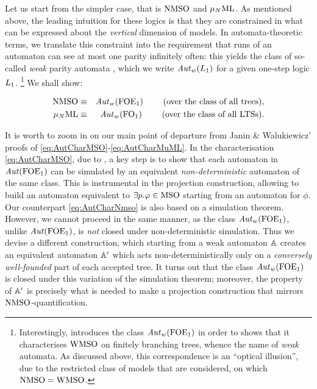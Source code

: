 Let us start from the simpler case, that is $\mathrm{NMSO}$ and $\mu_{N}\mathrm{ML}$.
As mentioned above, the leading intuition for these logics is that they are
constrained in what can be expressed about the \emph{vertical} dimension of 
models. 
In automata-theoretic terms, we translate this constraint into the requirement 
that runs of an automaton can see at most one parity infinitely often: this 
yields the class of so-called \emph{weak} parity 
automata \cite{MullerSaoudiSchupp92}, which we write $\mathit{Aut}_{w}(L_{1})$ for a
given one-step logic $L_{1}$. \footnote{%
    Interestingly, \cite{MullerSaoudiSchupp92} introduces the class
    $\mathit{Aut}_{w}(\mathrm{FOE}_1)$ in order to shows that it characterises $\mathrm{WMSO}$ on 
    finitely branching trees, whence the name of \emph{weak} automata. 
    As discussed above, this correspondence is an ``optical illusion'', due to
    the restricted class of models that are considered, on which $\mathrm{NMSO} = 
    \mathrm{WMSO}$.
    } 
We shall show:
\begin{theorem}
\begin{eqnarray}
\mathrm{NMSO} & \equiv & \mathit{Aut}_{w}(\mathrm{FOE}_1)
  \qquad \text{ (over the class of all trees)}, \label{eq:AutCharNmso}
\\ \mu_{N}\mathrm{ML} & \equiv & \mathit{Aut}_{w}(\mathrm{FO}_1)\label{eq:AutCharMudML}
  \qquad \text{ (over the class of all LTSs)}.
\end{eqnarray}
\end{theorem}
It is worth to zoom in on our main point of departure from Janin \& Walukiewicz' 
proofs of \eqref{eq:AutCharMSO}-\eqref{eq:AutCharMuML}. 
In the characterisation \eqref{eq:AutCharMSO}, due to \cite{Walukiewicz96}, 
a key step is to show that each automaton in $\mathit{Aut}(\mathrm{FOE}_1)$ can be simulated by
an equivalent \emph{non-deterministic} automaton of the same class. 
This is instrumental in the projection construction, allowing to build an
automaton equivalent to $\exists p.\varphi \in \mathrm{MSO}$ starting from an automaton 
for $\phi$. 
Our counterpart \eqref{eq:AutCharNmso} is also based on a simulation theorem. 
However, we cannot proceed in the same manner, as the class $\mathit{Aut}_{w}(\mathrm{FOE}_1)$,
unlike $\mathit{Aut}(\mathrm{FOE}_1)$, is \emph{not} closed under non-deterministic simulation.
Thus we devise a different construction, which starting from a weak automaton 
$\mathbb{A}$ creates an equivalent automaton $\mathbb{A}'$ which acts non-deterministically 
only on a \emph{conversely well-founded} part of each accepted tree.
It turns out that the class $\mathit{Aut}_{w}(\mathrm{FOE}_1)$ is closed under this variation of 
the simulation theorem; moreover, the property of $\mathbb{A}'$ is precisely what is
needed to make a projection construction that mirrors $\mathrm{NMSO}$-quantification.
\medskip

